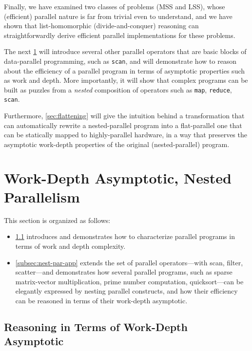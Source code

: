 \documentclass[acmsmall,review]{acmart}\settopmatter{printfolios=true,printccs=false,printacmref=false}
\begin{document}
Finally, we have examined two classes of problems (MSS and LSS), 
whose (efficient) parallel nature is far from trivial even to understand, 
and we have shown that list-homomorphic 
(divide-and-conquer) reasoning can straightforwardly derive 
efficient parallel implementations for these problems.

The next \cref{sec-nested-par} will introduce several other parallel 
operators that are basic blocks of data-parallel programming, 
such as \lstinline{scan}, and will demonstrate how to reason about 
the efficiency of a parallel program in terms of asymptotic properties 
such as work and depth.
More importantly, it will show that complex programs can be built as
puzzles from a \emph{nested} composition of operators such as 
\lstinline{map}, \lstinline{reduce}, \lstinline{scan}.

Furthermore, \cref{sec:flattening} will give the intuition behind a 
transformation that can automatically rewrite a nested-parallel 
program into a flat-parallel one that can be statically mapped to 
highly-parallel hardware, in a way that preserves the asymptotic 
work-depth properties of the original (nested-parallel) program. 

\newpage
\section{Work-Depth Asymptotic, Nested Parallelism}
\label{sec-nested-par}

This section is organized as follows: 
\begin{itemize}
    \item \cref{subsec:work-depth} introduces and demonstrates 
        how to characterize parallel programs in terms of 
        work and depth complexity. 
            
    \item \cref{subsec:nest-par-app} extends the set of parallel
        operators---with scan, filter, scatter---and demonstrates
        how several parallel programs, such as sparse matrix-vector 
        multiplication, prime number computation, quicksort---can
        be elegantly expressed by nesting parallel constructs, and 
        how their efficiency can be reasoned in terms of their 
        work-depth asymptotic.
\end{itemize}

\subsection{Reasoning in Terms of Work-Depth Asymptotic}
\label{subsec:work-depth}
\end{document}
